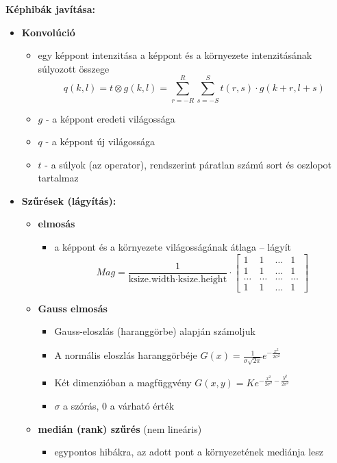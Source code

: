 \textbf{Képhibák javítása:}
\begin{itemize}
    \item \textbf{Konvolúció}
    \begin{itemize}
        \item egy képpont intenzitása a képpont és a környezete intenzitásának súlyozott összege
        \begin{equation*}
            q(k,l) = t \otimes g(k,l) = \sum_{r=-R}^{R} \sum_{s=-S}^{S} t(r,s) \cdot g(k+r, l+s)
        \end{equation*}
        \item $g$ - a képpont eredeti világossága
        \item $q$ - a képpont új világossága
        \item $t$ - a súlyok (az operator), rendszerint páratlan számú sort és oszlopot tartalmaz
    \end{itemize}
    \item \textbf{Szűrések (lágyítás):}
    \begin{itemize}
        \item \textbf{elmosás}
        \begin{itemize}
            \item a képpont és a környezete világosságának átlaga -- lágyít
            \begin{equation*}
                Mag = \frac{1}{\text{ksize.width} \cdot \text{ksize.height}} \cdot \begin{bmatrix}
                    1 & 1 & \dots & 1 \\
                    1 & 1 & \dots & 1 \\
                    \dots & \dots & \dots & \dots \\
                    1 & 1 & \dots & 1
                \end{bmatrix}
            \end{equation*}
        \end{itemize}
        \item \textbf{Gauss elmosás}
        \begin{itemize}
            \item Gauss-eloszlás (haranggörbe) alapján számoljuk
            \item A normális eloszlás haranggörbéje \quad $G(x) = \frac{1}{\sigma \sqrt{2\pi}} e^{-\frac{x^2}{2\sigma^2}}$
            \item Két dimenzióban a magfüggvény \quad $G(x,y) = K e^{-\frac{x^2}{2\sigma^2} - \frac{y^2}{2\sigma^2}}$
            \item $\sigma$ a szórás, 0 a várható érték
        \end{itemize}
        \item \textbf{medián (rank) szűrés} (nem lineáris)
        \begin{itemize}
            \item egypontos hibákra, az adott pont a környezetének mediánja lesz
        \end{itemize}
    \end{itemize}
\end{itemize}

